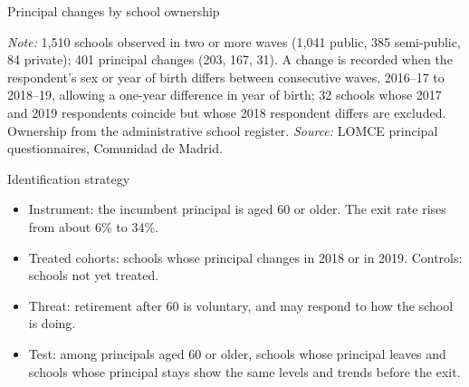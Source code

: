 \documentclass[aspectratio=169,11pt]{beamer}
\begin{document}
\begin{frame}{Principal changes by school ownership}
\vspace{0.1cm}
\begin{center}
\end{center}
\vspace{-0.1cm}
{\scriptsize \textit{Note:} 1,510 schools observed in two or more waves (1,041 public, 385 semi-public, 84 private); 401 principal changes (203, 167, 31). A change is recorded when the respondent's sex or year of birth differs between consecutive waves, 2016--17 to 2018--19, allowing a one-year difference in year of birth; 32 schools whose 2017 and 2019 respondents coincide but whose 2018 respondent differs are excluded. Ownership from the administrative school register. \textit{Source:} LOMCE principal questionnaires, Comunidad de Madrid.}
\end{frame}

\begin{frame}{Identification strategy}
\vspace{0.4cm}
\begin{itemize}\setlength{\itemsep}{1.1em}
\item Instrument: the incumbent principal is aged 60 or older. The exit rate rises from about 6\% to 34\%.
\item Treated cohorts: schools whose principal changes in 2018 or in 2019. Controls: schools not yet treated.
\item Threat: retirement after 60 is voluntary, and may respond to how the school is doing.
\item Test: among principals aged 60 or older, schools whose principal leaves and schools whose principal stays show the same levels and trends before the exit.
\end{itemize}
\end{frame}
\end{document}

